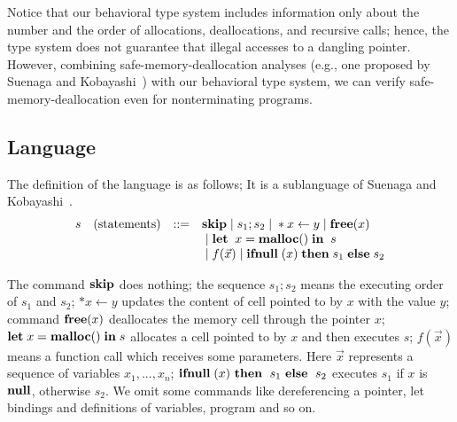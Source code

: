 \documentclass{sigplanconf}
\begin{document}
Notice that our behavioral type system includes information only about
the number and the order of allocations, deallocations, and recursive
calls; hence, the type system does not guarantee that illegal accesses
to a dangling pointer.  However, combining safe-memory-deallocation
analyses (e.g., one proposed by Suenaga and
Kobayashi~\cite{DBLP:conf/aplas/SuenagaK09}) with our behavioral type
system, we can verify safe-memory-deallocation even for nonterminating
programs.

\subsection{Language}
The definition of the language is as follows; It
is a sublanguage of Suenaga and Kobayashi~\cite{DBLP:conf/aplas/SuenagaK09}.
\[
\begin{array}{rlcl}
  s & (\mbox{statements})&::=&\mathbf{skip} \;|\; s_{1};s_{2} \;|\; *x \leftarrow y \;|\; \mathbf{free} (x) \\
  & & & \;|\; \mathbf{let}\;\; x = \mathbf{malloc()} \; \mathbf{in}\; \; s  \\
  & &  & \;|\; f(\vec{x}) \;|\; \mathbf{ifnull}\;(x) \; \mathbf{then}\; s_{1}\; \mathbf{else}\; s_{2} \\
\end{array}
\]


The command $\mathbf{skip}$ does nothing; the sequence $s_{1};s_{2}$ means the
executing order of $s_{1}$ and $s_{2}$; \(*x \leftarrow y\) updates
the content of cell pointed to by \(x\) with the value \(y\); command
$\mathbf{free}(x)$ deallocates the memory cell through the pointer $x$;
\(\mathbf{let}\; x = \mathbf{malloc()} \; \mathbf{in}\; s\) allocates a cell pointed to by \(x\) and
then executes \(s\); $f(\vec{x})$ means a function call which receives
some parameters. Here $\vec{x}$ represents a sequence of variables
\(x_1,...,x_n\); \(\mathbf{ifnull}\;(x)\ \mathbf{then}\;\ s_1\ \mathbf{else}\;\ s_2\) executes
\(s_1\) if \(x\) is \(\mathbf{null}\), otherwise \(s_2\). We omit some
commands like dereferencing a pointer, let bindings and definitions
of variables, program and so on.
\end{document}
